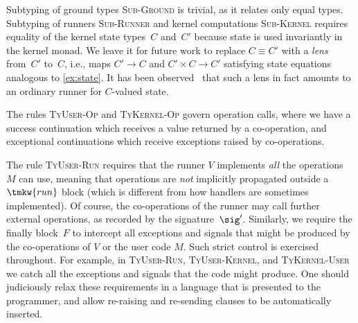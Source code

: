 Subtyping of ground types \textsc{Sub-Ground} is trivial, as it relates only equal types.
Subtyping of runners \textsc{Sub-Runner} and kernel computations
\textsc{Sub-Kernel} requires equality of the kernel state types~$C$ and~$C'$
because state is used invariantly in the kernel monad.
We leave it for future work to replace ${C \equiv C'}$ with a
\emph{lens}~\cite{Foster:Lenses} from~$C'$ to~$C$, i.e., maps $C' \to C$ and ${C' \times C \to C'}$
satisfying state equations analogous to \cref{ex:state}. It has been
observed~\cite{OConnor:Lens,Power:Comodels} that such a lens in fact amounts to
an ordinary runner for $C$-valued state.

The rules \textsc{TyUser-Op} and \textsc{TyKernel-Op} govern operation calls, where 
we have a success continuation which receives a value returned by a 
co-operation, and exceptional continuations which receive exceptions raised by co-operations.

The rule \textsc{TyUser-Run} requires that the runner $V$ implements \emph{all} the
operations $M$ can use, meaning that operations are \emph{not} implicitly propagated outside a $\tmkw{run}$ block (which is different from how handlers are sometimes implemented). Of course, the co-operations of the runner may call further external operations, as recorded by the signature~$\sig'$. Similarly, we require the finally block~$F$ to intercept all exceptions and signals that might be produced by the co-operations of $V$ or the user code $M$.
%
Such strict control is exercised throughout. For example, in 
\textsc{TyUser-Run}, \textsc{TyUser-Kernel}, and \textsc{TyKernel-User} we catch all the exceptions and signals that the code might produce.
%
One should judiciously relax these requirements in a language that is presented to
the programmer, and allow re-raising and re-sending clauses to be automatically inserted.

